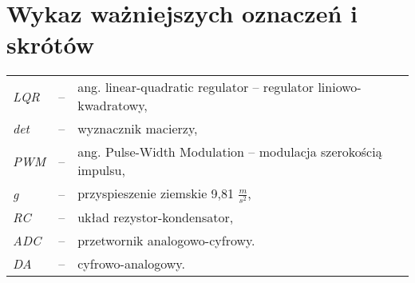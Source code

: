 \chapter*{Wykaz ważniejszych oznaczeń i skrótów}

\begin{tabular}{lcl}
	
	\textit{LQR} & -- & ang. linear-quadratic regulator -- regulator liniowo-kwadratowy, \\
	\textit{det} & -- & wyznacznik macierzy, \\
	\textit{PWM} & -- & ang. Pulse-Width Modulation -- modulacja szerokością impulsu, \\
	\textit{g} & -- & przyspieszenie ziemskie 9,81 $\frac{m}{s^2}$, \\
	\textit{RC} & -- & układ rezystor-kondensator, \\
	\textit{ADC} & -- & przetwornik analogowo-cyfrowy. \\
	\textit{DA} & -- & cyfrowo-analogowy. \\
\end{tabular} 
